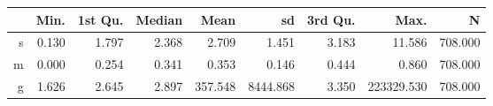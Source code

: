 \begin{table}[ht]
\centering
\begin{tabular}{rrrrrrrrr}
  \hline
 & Min. & 1st Qu. & Median & Mean & sd & 3rd Qu. & Max. & N \\ 
  \hline
s & 0.130 & 1.797 & 2.368 & 2.709 & 1.451 & 3.183 & 11.586 & 708.000 \\ 
  m & 0.000 & 0.254 & 0.341 & 0.353 & 0.146 & 0.444 & 0.860 & 708.000 \\ 
  g & 1.626 & 2.645 & 2.897 & 357.548 & 8444.868 & 3.350 & 223329.530 & 708.000 \\ 
   \hline
\end{tabular}
\end{table}
